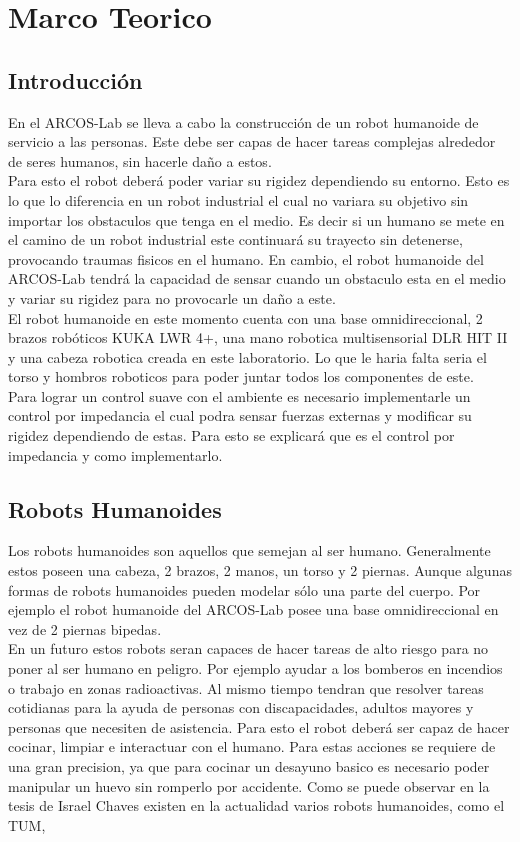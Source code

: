   \chapter{Marco Teorico} 
\label{C:antecedentes}

\section{Introducción}
En el ARCOS-Lab se lleva a cabo la construcción de un robot humanoide de servicio a las personas. 
Este debe ser capas de hacer tareas complejas 
alrededor de seres humanos, sin hacerle daño a estos. \\
Para esto el robot deberá poder variar su rigidez dependiendo su entorno. 
Esto es lo que lo diferencia en un robot industrial el cual no variara su 
objetivo sin importar los obstaculos que tenga en el medio. 
Es decir si un humano se mete en el camino de un robot industrial este continuará su 
trayecto sin detenerse, provocando traumas fisicos en el humano. 
En cambio, el robot humanoide del ARCOS-Lab tendrá la capacidad de sensar cuando un 
obstaculo esta en el medio y variar su rigidez para no provocarle un daño a este.\\
El robot humanoide en este momento cuenta con una base omnidireccional, 2 brazos robóticos KUKA LWR 4+, una mano robotica multisensorial DLR HIT II y 
una cabeza robotica creada en este laboratorio. 
Lo que le haria falta seria el torso y hombros roboticos para poder juntar todos los componentes de este.\\
Para lograr un control suave con el ambiente es necesario implementarle un control por impedancia el cual podra sensar fuerzas externas y modificar su 
rigidez dependiendo de estas. 
Para esto se explicará que es el control por impedancia y como implementarlo.

\section{Robots Humanoides}
Los robots humanoides son aquellos que semejan al ser humano. 
Generalmente estos  poseen una cabeza, 2 brazos, 2 manos, un torso y 2 piernas. 
Aunque algunas formas de robots humanoides pueden modelar sólo una parte del cuerpo. 
Por ejemplo el robot humanoide del ARCOS-Lab posee una base 
omnidireccional en vez de 2 piernas bipedas. \\
En un futuro estos robots seran capaces de hacer tareas de alto riesgo para no poner al ser humano en peligro. 
Por ejemplo ayudar a los bomberos en incendios o trabajo en zonas radioactivas. 
Al mismo tiempo tendran que resolver tareas cotidianas para la ayuda de personas con discapacidades, 
adultos mayores y personas que necesiten de asistencia. Para esto el robot deberá ser capaz de hacer cocinar, limpiar e interactuar con el humano. 
Para estas acciones se requiere de una gran precision, ya que para cocinar un desayuno basico es necesario poder manipular un huevo sin romperlo por 
accidente.
Como se puede observar en la tesis de Israel Chaves  \tesis existen en la actualidad varios robots humanoides, como el TUM, 


